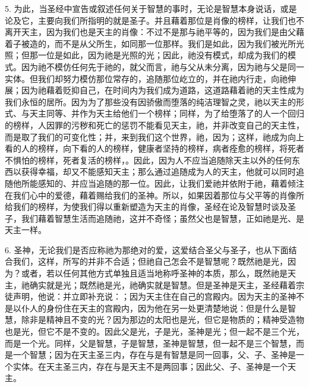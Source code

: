 5. 为此，当圣经中宣告或叙述任何关于智慧的事时，无论是智慧本身说话，或是论及它，主要向我们所指明的就是圣子。并且藉着那位是肖像的榜样，让我们也不离开天主，因为我们也是天主的肖像：不过不是那与祂平等的，因为我们是由父藉着子被造的，而不是从父所生，如同那一位那样。我们是如此，因为我们被光所光照；但那一位是如此，因为祂是光照的光；因此，祂没有模式，却成为我们的模式。因为祂不模仿任何先于祂的，就父而言，祂与父从未分离，因为祂与父是同一实体。但我们却努力模仿那位常存的，追随那位屹立的，并在祂内行走，向祂伸展；因为祂藉着贬抑自己，在时间内为我们成为道路，这道路藉着祂的天主性成为我们永恒的居所。因为为了那些没有因骄傲而堕落的纯洁理智之灵，祂以天主的形式、与天主同等、并作为天主给他们一个榜样；同样，为了给堕落了的人一个回归的榜样，人因罪的污秽和死亡的惩罚不能看见天主，祂，并非改变自己的天主性，而是取了我们的可变化性；并，来到我们这个世界，祂，因为；这样，祂成为向上看的人的榜样，向下看的人的榜样，健康者坚持的榜样，病者痊愈的榜样，将死者不惧怕的榜样，死者复活的榜样，。因此，因为人不应当追随除天主以外的任何东西以获得幸福，却又不能感知天主；那么通过追随成为人的天主，他就可以同时追随他所能感知的、并应当追随的那一位。因此，让我们爱祂并依附于祂，藉着倾注在我们心中的爱德，藉着赐给我们的圣神。所以，如果因着那位与父平等的肖像所给我们的榜样，为使我们得以重新塑造为天主的肖像，圣经在论及智慧时谈及圣子，我们藉着智慧生活而追随祂，这并不奇怪；虽然父也是智慧，正如祂是光、是天主一样。\par

6. 圣神，无论我们是否应称祂为那绝对的爱，这爱结合圣父与圣子，也从下面结合我们，这样，所写的并非不合适；但祂自己怎会不是智慧呢？既然祂是光，因为？或者，若以任何其他方式单独且适当地称呼圣神的本质，那么，既然祂是天主，祂确实就是光；既然祂是光，祂确实就是智慧。但是圣神是天主，圣经藉着宗徒声明，他说：并立即补充说：；因为天主住在自己的宫殿内。因为天主的圣神不是以仆人的身份住在天主的宫殿内，因为他在另一处更清楚地说：但是什么是智慧，除非是精神且不变的光？因为那边的太阳也是光，但它是物质的；精神受造物也是光，但它不是不变的。因此父是光，子是光，圣神是光；但一起不是三个光，而是一个光。同样，父是智慧，子是智慧，圣神是智慧，但一起不是三个智慧，而是一个智慧；因为在天主圣三内，存在与是有智慧是同一回事，父、子、圣神是一个实体。在天主圣三内，存在与是天主不是两回事；因此父、子、圣神是一个天主。\par

